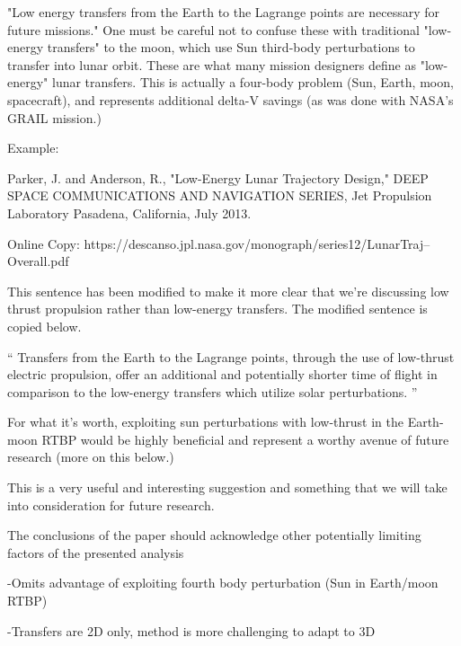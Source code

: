 \documentclass[11pt]{article}
\newenvironment{correction}{\begin{list}{}{\setlength{\leftmargin}{1cm}\setlength{\rightmargin}{1cm}}\vspace{\parsep}\item[]``}{''\end{list}}
\begin{document}
\begin{enumerate}
\item
    \begin{itshape}
"Low energy transfers from the Earth to the Lagrange points are necessary for future missions."  One must be careful not to confuse these with traditional "low-energy transfers" to the moon, which use Sun third-body perturbations to transfer into lunar orbit.  These are what many mission designers define as "low-energy" lunar transfers.  This is actually a four-body problem (Sun, Earth, moon, spacecraft), and represents additional delta-V savings (as was done with NASA's GRAIL mission.)

Example:


Parker, J. and Anderson, R., "Low-Energy Lunar Trajectory Design," DEEP SPACE COMMUNICATIONS AND NAVIGATION SERIES, Jet Propulsion Laboratory Pasadena, California, July 2013.

Online Copy: https://descanso.jpl.nasa.gov/monograph/series12/LunarTraj--Overall.pdf
\end{itshape}
This sentence has been modified to make it more clear that we're discussing low thrust propulsion rather than low-energy transfers.
The modified sentence is copied below.

\begin{correction}
Transfers from the Earth to the Lagrange points, through the use of low-thrust electric propulsion, offer an additional and potentially shorter time of flight in comparison to the low-energy transfers which utilize solar perturbations.
\end{correction}

\item 
    \begin{itshape}
For what it's worth, exploiting sun perturbations with low-thrust in the Earth-moon RTBP would be highly beneficial and represent a worthy avenue of future research (more on this below.)
\end{itshape}

This is a very useful and interesting suggestion and something that we will take into consideration for future research.

\item 
    \begin{itshape}
The conclusions of the paper should acknowledge other potentially limiting factors of the presented analysis

-Omits advantage of exploiting fourth body perturbation (Sun in Earth/moon RTBP)

-Transfers are 2D only, method is more challenging to adapt to 3D


\end{itshape}
\end{enumerate}
\end{document}
